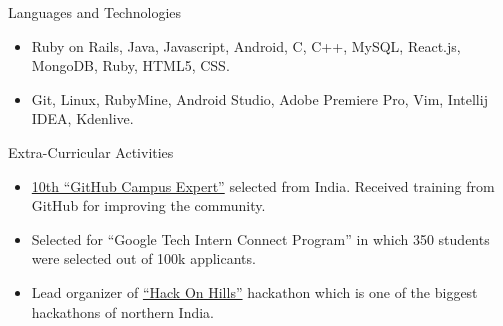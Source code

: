 \documentclass[]{mcdowellcv}
\begin{document}
	\begin{cvsection}{Languages and Technologies}
		\begin{cvsubsection}{}{}{}	
			\begin{itemize}
				\item Ruby on Rails, Java, Javascript, Android, C, C++, MySQL, React.js, MongoDB, Ruby, HTML5, CSS.
				\item Git, Linux, RubyMine, Android Studio, Adobe Premiere Pro, Vim, Intellij IDEA, Kdenlive.
			\end{itemize}
		\end{cvsubsection}
	\end{cvsection}
	
	\begin{cvsection}{Extra-Curricular Activities}
		\begin{cvsubsection}{}{}{}	
			\begin{itemize}
				\item {\href {https://githubcampus.expert/sukhbir-singh/}{10th ``GitHub Campus Expert''}} selected from India. Received training from GitHub for improving the community.
				\item Selected for ``Google Tech Intern Connect Program'' in which 350 students were selected out of 100k applicants.
				\item Lead organizer of {\href {http://hackonhills.com/}{``Hack On Hills''}} hackathon which is one of the biggest hackathons of northern India.
			\end{itemize}
		\end{cvsubsection}
	\end{cvsection}
	
\end{document}

